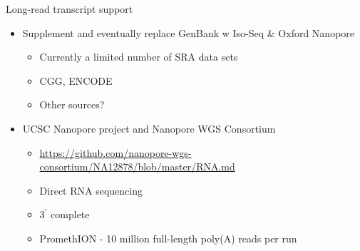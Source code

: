 \documentclass[10pt,
               hyperref={bookmarks=false,
                         bookmarksopen=false,
                         colorlinks=true,
                         linkcolor=blue,
                         urlcolor=blue},
               xcolor={svgnames,table}]{beamer}
\newenvironment{tightitemize}{%
\begin{itemize}
  \setlength{\itemsep}{1pt}%
  \setlength{\parskip}{0pt}%
  \setlength{\parsep}{0pt}%
}{\end{itemize}}
\begin{document}
\begin{frame}{Long-read transcript support}
  \begin{itemize}
  \item Supplement and eventually replace GenBank w Iso-Seq \& Oxford Nanopore
    \begin{tightitemize}
    \item Currently a limited number of SRA data sets
    \item CGG, ENCODE
    \item Other sources? 
    \end{tightitemize}
  \item UCSC Nanopore project and Nanopore WGS Consortium
    \begin{tightitemize}
    \item \url{https://github.com/nanopore-wgs-consortium/NA12878/blob/master/RNA.md}
    \item Direct RNA sequencing
    \item $3^\prime$ complete
    \item PromethION - 10 million full-length poly(A) reads per run
    \end{tightitemize}
  \end{itemize}
\end{frame}
\end{document}
